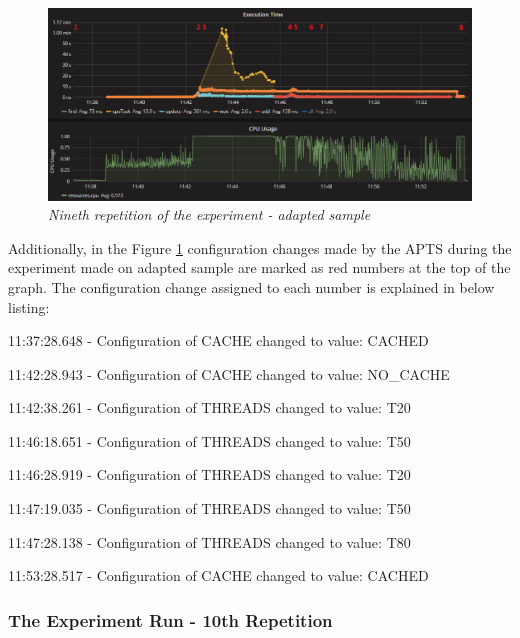 \documentclass[12pt,a4paper]{article}
\let\tmpone\enumerate
\let\tmptwo\endenumerate
\renewenvironment{enumerate}{\tmpone\addtolength{\itemsep}{-0.4\baselineskip}}{\tmptwo}
\begin{document}
\begin{figure}[!htb]
\centering
\includegraphics[width=1\textwidth]{9-adap}
\caption{\textit{Nineth repetition of the experiment - adapted sample}} \label{figure:random:screen:adapted:9}
\end{figure}

Additionally, in the Figure \ref{figure:random:screen:adapted:9} configuration changes made by the APTS during the experiment made on adapted sample are marked as red numbers at the top of the graph. The configuration change assigned to each number is explained in below listing: 

\begin{enumerate}
\item 11:37:28.648 - Configuration of CACHE changed to value: CACHED
\item 11:42:28.943 - Configuration of CACHE changed to value: NO\_CACHE
\item 11:42:38.261 - Configuration of THREADS changed to value: T20
\item 11:46:18.651 - Configuration of THREADS changed to value: T50
\item 11:46:28.919 - Configuration of THREADS changed to value: T20
\item 11:47:19.035 - Configuration of THREADS changed to value: T50
\item 11:47:28.138 - Configuration of THREADS changed to value: T80
\item 11:53:28.517 - Configuration of CACHE changed to value: CACHED
\end{enumerate}





\subsubsection{The Experiment Run - 10th Repetition}
\end{document}
